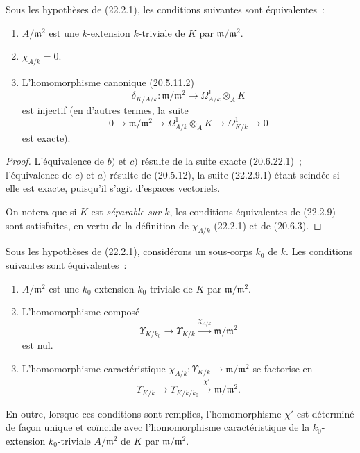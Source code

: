 \begin{proposition}[22.2.9]
\label{0.22.2.9-fr}
Sous les hypothèses de (22.2.1), les conditions suivantes sont
équivalentes~:
\begin{enumerate}
  \item[a)] $A/\mathfrak m^2$ est une $k$-extension $k$-triviale de $K$ par
  $\mathfrak m/\mathfrak m^2$.
  \item[b)] $\chi_{A/k}=0$.
  \item[c)] L'homomorphisme canonique (20.5.11.2)
  \[
    \delta_{K/A/k}:\mathfrak m/\mathfrak m^2
    \longrightarrow\Omega^1_{A/k}\otimes_AK
  \]
  est injectif (en d'autres termes, la suite
  \begin{equation}
  \tag{22.2.9.1}
  \label{0.22.2.9.1-fr}
    0\longrightarrow\mathfrak m/\mathfrak m^2
    \longrightarrow\Omega^1_{A/k}\otimes_AK
    \longrightarrow\Omega^1_{K/k}\longrightarrow0
  \end{equation}
  est exacte).
\end{enumerate}
\end{proposition}

\begin{proof}
L'équivalence de $b)$ et $c)$ résulte de la suite exacte (20.6.22.1)~;
l'équivalence de $c)$ et $a)$ résulte de (20.5.12), la suite (22.2.9.1)
étant scindée si elle est exacte, puisqu'il s'agit d'espaces vectoriels.

On notera que si $K$ est \emph{séparable sur $k$}, les conditions
équivalentes de (22.2.9) sont satisfaites, en vertu de la définition de
$\chi_{A/k}$ (22.2.1) et de (20.6.3).
\end{proof}

\begin{corollary}[22.2.10]
\label{0.22.2.10-fr}
Sous les hypothèses de (22.2.1), considérons un sous-corps $k_0$ de $k$. Les
conditions suivantes sont équivalentes~:
\begin{enumerate}
  \item[a)] $A/\mathfrak m^2$ est une $k_0$-extension $k_0$-triviale de $K$
  par $\mathfrak m/\mathfrak m^2$.
  \item[b)] L'homomorphisme composé
  \[
    \Upsilon_{K/k_0}\longrightarrow\Upsilon_{K/k}
    \xrightarrow{\chi_{A/k}}\mathfrak m/\mathfrak m^2
  \]
  est nul.
  \item[c)] L'homomorphisme caractéristique
  $\chi_{A/k}:\Upsilon_{K/k}\to\mathfrak m/\mathfrak m^2$ se factorise en
  \[
    \Upsilon_{K/k}\longrightarrow\Upsilon_{K/k/k_0}
    \xrightarrow{\chi'}\mathfrak m/\mathfrak m^2.
  \]
\end{enumerate}
En outre, lorsque ces conditions sont remplies, l'homomorphisme $\chi'$ est
déterminé de façon unique et coïncide avec l'homomorphisme caractéristique
de la $k_0$-extension $k_0$-triviale $A/\mathfrak m^2$ de $K$ par
$\mathfrak m/\mathfrak m^2$.
\end{corollary}

